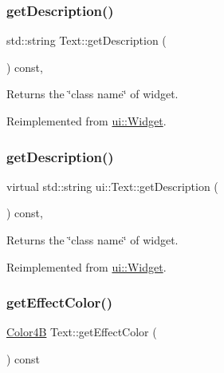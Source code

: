 \subsubsection{\texorpdfstring{get\+Description()}{getDescription()}\hspace{0.1cm}{\footnotesize\ttfamily [1/2]}}
{\footnotesize\ttfamily std\+::string Text\+::get\+Description (\begin{DoxyParamCaption}{ }\end{DoxyParamCaption}) const\hspace{0.3cm}{\ttfamily [override]}, {\ttfamily [virtual]}}

Returns the \char`\"{}class name\char`\"{} of widget. 

Reimplemented from \hyperlink{classui_1_1Widget_ad85abdaa9133dc6b8efc32670ae9b93f}{ui\+::\+Widget}.

\mbox{\label{classui_1_1Text_ac554a5ade84b530bb1a4e45a1744ceb6}} 
\subsubsection{\texorpdfstring{get\+Description()}{getDescription()}\hspace{0.1cm}{\footnotesize\ttfamily [2/2]}}
{\footnotesize\ttfamily virtual std\+::string ui\+::\+Text\+::get\+Description (\begin{DoxyParamCaption}{ }\end{DoxyParamCaption}) const\hspace{0.3cm}{\ttfamily [override]}, {\ttfamily [virtual]}}

Returns the \char`\"{}class name\char`\"{} of widget. 

Reimplemented from \hyperlink{classui_1_1Widget_ad85abdaa9133dc6b8efc32670ae9b93f}{ui\+::\+Widget}.

\mbox{\label{classui_1_1Text_a7dea98904863fbc99c51169576f346f6}} 
\subsubsection{\texorpdfstring{get\+Effect\+Color()}{getEffectColor()}\hspace{0.1cm}{\footnotesize\ttfamily [1/2]}}
{\footnotesize\ttfamily \hyperlink{structColor4B}{Color4B} Text\+::get\+Effect\+Color (\begin{DoxyParamCaption}{ }\end{DoxyParamCaption}) const}

